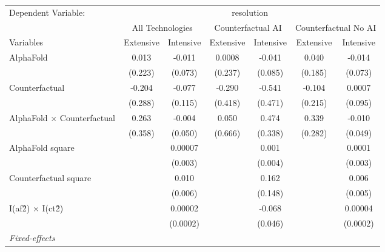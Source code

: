 \begingroup
\centering
\begin{tabular}{lcccccc}
   \tabularnewline \midrule \midrule
   Dependent Variable: & \multicolumn{6}{c}{resolution}\\
 & \multicolumn{2}{c}{All Technologies} & \multicolumn{2}{c}{Counterfactual AI} & \multicolumn{2}{c}{Counterfactual No AI} \\
\cmidrule(lr){1-1}\cmidrule(lr){2-3} \cmidrule(lr){4-5} \cmidrule(lr){6-7}
Variables & \multicolumn{1}{c}{Extensive} & \multicolumn{1}{c}{Intensive} & \multicolumn{1}{c}{Extensive} & \multicolumn{1}{c}{Intensive} & \multicolumn{1}{c}{Extensive} & \multicolumn{1}{c}{Intensive} \\
\cmidrule(lr){1-1}\cmidrule(lr){2-2} \cmidrule(lr){3-3} \cmidrule(lr){4-4} \cmidrule(lr){5-5} \cmidrule(lr){6-6} \cmidrule(lr){7-7}
   AlphaFold                          & 0.013   & -0.011   & 0.0008  & -0.041  & 0.040   & -0.014\\   
                                      & (0.223) & (0.073)  & (0.237) & (0.085) & (0.185) & (0.073)\\   
   Counterfactual                     & -0.204  & -0.077   & -0.290  & -0.541  & -0.104  & 0.0007\\   
                                      & (0.288) & (0.115)  & (0.418) & (0.471) & (0.215) & (0.095)\\   
   AlphaFold $\times$ Counterfactual  & 0.263   & -0.004   & 0.050   & 0.474   & 0.339   & -0.010\\   
                                      & (0.358) & (0.050)  & (0.666) & (0.338) & (0.282) & (0.049)\\   
   AlphaFold square                   &         & 0.00007  &         & 0.001   &         & 0.0001\\   
                                      &         & (0.003)  &         & (0.004) &         & (0.003)\\   
   Counterfactual square              &         & 0.010    &         & 0.162   &         & 0.006\\   
                                      &         & (0.006)  &         & (0.148) &         & (0.005)\\   
   I(af\^2) $\times$ I(ct\^2)         &         & 0.00002  &         & -0.068  &         & 0.00004\\   
                                      &         & (0.0002) &         & (0.046) &         & (0.0002)\\   
   \midrule
   \emph{Fixed-effects}\\

\end{tabular}
